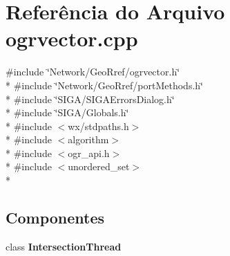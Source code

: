 \section{Referência do Arquivo ogrvector.\+cpp}
\label{ogrvector_8cpp}
{\ttfamily \#include \char`\"{}Network/\+Geo\+Rref/ogrvector.\+h\char`\"{}}\\*
{\ttfamily \#include \char`\"{}Network/\+Geo\+Rref/port\+Methods.\+h\char`\"{}}\\*
{\ttfamily \#include \char`\"{}S\+I\+G\+A/\+S\+I\+G\+A\+Errors\+Dialog.\+h\char`\"{}}\\*
{\ttfamily \#include \char`\"{}S\+I\+G\+A/\+Globals.\+h\char`\"{}}\\*
{\ttfamily \#include $<$wx/stdpaths.\+h$>$}\\*
{\ttfamily \#include $<$algorithm$>$}\\*
{\ttfamily \#include $<$ogr\+\_\+api.\+h$>$}\\*
{\ttfamily \#include $<$unordered\+\_\+set$>$}\\*
\subsection*{Componentes}
\begin{DoxyCompactItemize}
\item 
class {\bf Intersection\+Thread}
\end{DoxyCompactItemize}
